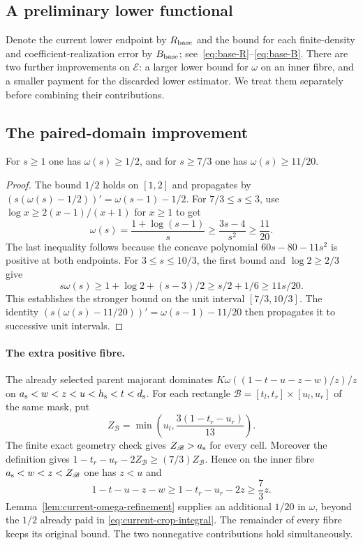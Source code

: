 \subsection{A preliminary lower functional}

Denote the current lower endpoint by $R_{\rm base}$ and the bound
for each finite-density and coefficient-realization error by
$B_{\rm base}$; see~\eqref{eq:base-R}--\eqref{eq:base-B}.
There are two further improvements on $\mathscr E$: a larger lower bound
for $\omega$ on an inner fibre, and a smaller payment for the
discarded lower estimator. We treat them separately before combining
their contributions.

\subsection{The paired-domain improvement}
\label{sec:current-refinement}

\begin{lemma}
\label{lem:current-omega-refinement}
For $s\ge1$ one has $\omega(s)\ge1/2$, and for $s\ge7/3$ one has
$\omega(s)\ge11/20$.
\end{lemma}

\begin{proof}
The bound $1/2$ holds on $[1,2]$ and propagates by
$(s(\omega(s)-1/2))'=\omega(s-1)-1/2$.
For $7/3\le s\le3$, use $\log x\ge2(x-1)/(x+1)$ for $x\ge1$ to get
\[
 \omega(s)=\frac{1+\log(s-1)}s\ge\frac{3s-4}{s^2}\ge\frac{11}{20}.
\]
The last inequality follows because the concave polynomial
$60s-80-11s^2$ is positive at both endpoints.
For $3\le s\le10/3$, the first bound and $\log2\ge2/3$ give
\[
 s\omega(s)\ge1+\log2+(s-3)/2\ge s/2+1/6\ge11s/20.
\]
This establishes the stronger bound on the unit interval
$[7/3,10/3]$. The identity
$(s(\omega(s)-11/20))'=\omega(s-1)-11/20$ then propagates it to
successive unit intervals.
\end{proof}

\paragraph{The extra positive fibre.}
The already selected parent majorant dominates
$K\omega((1-t-u-z-w)/z)/z$ on ${a_{\rm s}}<w<z<u<{h_{\rm s}}<t<{d_{\rm s}}$.
For each rectangle $\mathscr B=[t_l,t_r]\times[u_l,u_r]$ of the same mask,
put
\begin{equation}
 Z_{\mathscr B}=\min\left(u_l,\frac{3(1-t_r-u_r)}{13}\right).
 \label{eq:current-Z}
\end{equation}
The finite exact geometry check gives $Z_{\mathscr B}>{a_{\rm s}}$ for every cell.
Moreover the definition gives
$1-t_r-u_r-2Z_{\mathscr B}\ge(7/3)Z_{\mathscr B}$.  Hence on the inner fibre
${a_{\rm s}}<w<z<Z_{\mathscr B}$ one has $z<u$ and
\[
 1-t-u-z-w\ge1-t_r-u_r-2z\ge\frac73z.
\]
Lemma~\ref{lem:current-omega-refinement} supplies an additional
$1/20$ in $\omega$, beyond the $1/2$ already paid in
\eqref{eq:current-crop-integral}.  The remainder of every fibre
keeps its original bound.  The two nonnegative contributions hold simultaneously.

